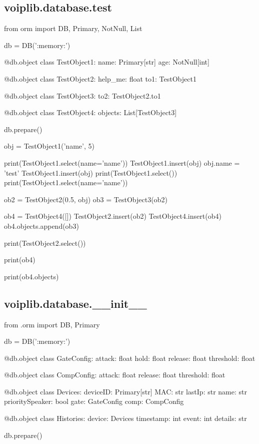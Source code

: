 \subsection{voiplib.database.test}
\begin{pythoncode}
from orm import DB, Primary, NotNull, List

db = DB(':memory:')


@db.object
class TestObject1:
    name: Primary[str]
    age: NotNull[int]


@db.object
class TestObject2:
    help_me: float
    to1: TestObject1


@db.object
class TestObject3:
    to2: TestObject2.to1


@db.object
class TestObject4:
    objects: List[TestObject3]


db.prepare()

obj = TestObject1('name', 5)

print(TestObject1.select(name='name'))
TestObject1.insert(obj)
obj.name = 'test'
TestObject1.insert(obj)
print(TestObject1.select())
print(TestObject1.select(name='name'))

ob2 = TestObject2(0.5, obj)
ob3 = TestObject3(ob2)

ob4 = TestObject4([])
TestObject2.insert(ob2)
TestObject4.insert(ob4)
ob4.objects.append(ob3)

print(TestObject2.select())

print(ob4)

print(ob4.objects)
\end{pythoncode}
\subsection{voiplib.database.\_\_init\_\_}
\begin{pythoncode}
from .orm import DB, Primary


db = DB(':memory:')


@db.object
class GateConfig:
    attack: float
    hold: float
    release: float
    threshold: float


@db.object
class CompConfig:
    attack: float
    release: float
    threshold: float


@db.object
class Devices:
    deviceID: Primary[str]
    MAC: str
    lastIp: str
    name: str
    prioritySpeaker: bool
    gate: GateConfig
    comp: CompConfig


@db.object
class Histories:
    device: Devices
    timestamp: int
    event: int
    details: str


db.prepare()
\end{pythoncode}
